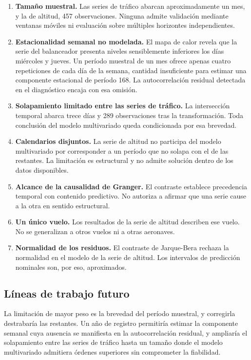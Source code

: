 \begin{enumerate}
\item \textbf{Tamaño muestral.} Las series de tráfico abarcan aproximadamente un mes, y la de
altitud, 457 observaciones. Ninguna admite validación mediante ventanas móviles ni evaluación
sobre múltiples horizontes independientes.

\item \textbf{Estacionalidad semanal no modelada.} El mapa de calor revela que la serie del
balanceador presenta niveles sensiblemente inferiores los días miércoles y jueves. Un período
muestral de un mes ofrece apenas cuatro repeticiones de cada día de la semana, cantidad
insuficiente para estimar una componente estacional de período 168. La autocorrelación residual detectada en el diagnóstico encaja con esa omisión.

\item \textbf{Solapamiento limitado entre las series de tráfico.} La intersección temporal
abarca trece días y 289 observaciones tras la transformación. Toda conclusión del modelo
multivariado queda condicionada por esa brevedad.

\item \textbf{Calendarios disjuntos.} La serie de altitud no participa del modelo multivariado
por corresponder a un período que no solapa con el de las restantes. La limitación es
estructural y no admite solución dentro de los datos disponibles.

\item \textbf{Alcance de la causalidad de Granger.} El contraste establece precedencia temporal
con contenido predictivo. No autoriza a afirmar que una serie cause a la otra en sentido
estructural.

\item \textbf{Un único vuelo.} Los resultados de la serie de altitud describen ese vuelo. No se
generalizan a otros vuelos ni a otras aeronaves.

\item \textbf{Normalidad de los residuos.} El contraste de Jarque-Bera rechaza la normalidad en
el modelo de la serie de altitud. Los intervalos de predicción nominales son, por eso, aproximados.
\end{enumerate}

\subsection{Líneas de trabajo futuro}

La limitación de mayor peso es la brevedad del período muestral, y corregirla destrabaría las
restantes. Un año de registro permitiría estimar la componente semanal cuya ausencia se
manifiesta en la autocorrelación residual, y ampliaría el solapamiento entre las series de
tráfico hasta un tamaño donde el modelo multivariado admitiera órdenes superiores sin
comprometer la fiabilidad.

